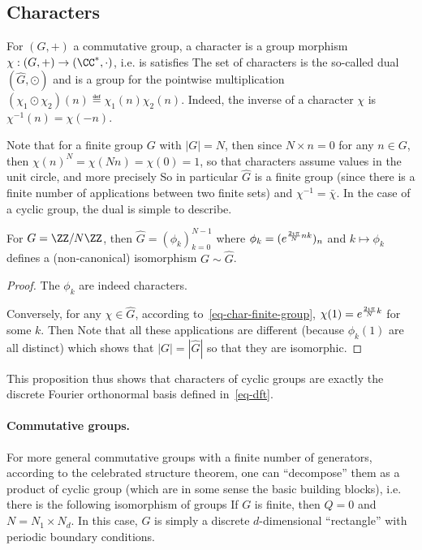 \subsection{Characters}

For $(G,+)$ a commutative group, a character is a group morphism $\chi : (G,+) \rightarrow (\CC^*,\cdot)$, i.e. is satisfies
The set of characters is the so-called dual $(\hat G,\odot)$ and is a group for the pointwise multiplication $(\chi_1 \odot \chi_2)(n) \eqdef \chi_1(n) \chi_2(n)$.  Indeed, the inverse of a character $\chi$ is $\chi^{-1}(n)=\chi(-n)$.

Note that for a finite group $G$ with $|G|=N$, then since $N \times n=0$ for any $n \in G$, then $\chi(n)^N=\chi(N n)=\chi(0)=1$, so that characters assume values in the unit circle, and more precisely
So in particular $\hat G$ is a finite group (since there is a finite number of applications between two finite sets) and $\chi^{-1}=\bar\chi$. In the case of a cyclic group, the dual is simple to describe.

\begin{prop}\label{prop-iso-cyclic}
	For $G=\ZZ/N\ZZ$, then $\hat G=( \phi_k )_{k=0}^{N-1}$ where $\phi_k=( e^{\frac{2\imath\pi}{N} nk} )_n$ and $k \mapsto \phi_k$ defines a (non-canonical) isomorphism $G \sim \hat G$. 
\end{prop}
\begin{proof}
	The $\phi_k$ are indeed characters.
	
	Conversely, for any $\chi \in \hat G$, according to~\eqref{eq-char-finite-group}, $\chi(1)=e^{\frac{2\imath\pi}{N} k}$ for some $k$. Then 
	Note that all these applications are different (because $\phi_k(1)$ are all distinct) which shows that $|G|=|\hat G|$ so that they are isomorphic. 
\end{proof}

This proposition thus shows that characters of cyclic groups are exactly the discrete Fourier orthonormal basis defined in~\eqref{eq-dft}. 


\paragraph{Commutative groups.}

For more general commutative groups with a finite number of generators, according to the celebrated structure theorem, one can ``decompose'' them as a product of cyclic group (which are in some sense the basic building blocks), i.e. there is the following isomorphism of groups
If $G$ is finite, then $Q=0$ and $N=N_1 \times N_d$. In this case, $G$ is simply a discrete $d$-dimensional ``rectangle'' with periodic boundary conditions. 

